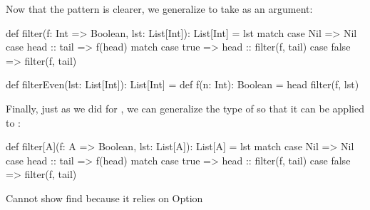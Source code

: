 \documentclass{book}
\begin{document}
Now that the pattern is clearer, we generalize  to take 
as an argument:

\begin{scalacode}
def filter(f: Int => Boolean, lst: List[Int]): List[Int] = lst match {
  case Nil => Nil
  case head :: tail =>
    f(head) match {
      case true => head :: filter(f, tail)
      case false => filter(f, tail)
    }
}

def filterEven(lst: List[Int]): List[Int] = {
  def f(n: Int): Boolean = head %
  filter(f, lst)
}
\end{scalacode}

Finally, just as we did for , we can generalize the type of 
so that it can be applied to :

\begin{scalacode}
def filter[A](f: A => Boolean, lst: List[A]): List[A] = lst match {
  case Nil => Nil
  case head :: tail =>
    f(head) match {
      case true => head :: filter(f, tail)
      case false => filter(f, tail)
    }
}
\end{scalacode}

\begin{instructor}
Cannot show find because it relies on Option
\end{instructor}





\end{document}
